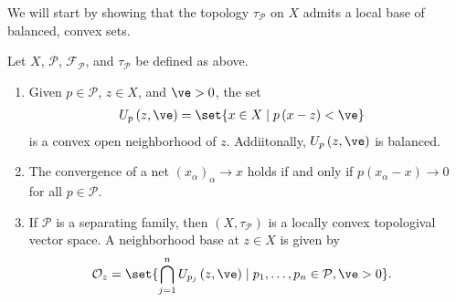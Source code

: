 \documentclass[10pt]{mypackage}
\begin{document}
We will start by showing that the topology $\tau_{\mathcal{P}}$ on $X$ admits a local base of balanced, convex sets.
\begin{theorem}
  Let $X$, $\mathcal{P}$, $\mathcal{F}_{\mathcal{P}}$, and $\tau_{\mathcal{P}}$ be defined as above.
  \begin{enumerate}[(1)]
    \item Given $p\in \mathcal{P}$, $z\in X$, and $\ve > 0$, the set
      \begin{align*}
        U_{p}\left(z,\ve\right) &= \set{x\in X\mid p\left(x-z\right) < \ve}
      \end{align*}
      is a convex open neighborhood of $z$. Addiitonally, $U_{p}\left(z,\ve\right)$ is balanced.
    \item The convergence of a net $\left(x_{\alpha}\right)_{\alpha}\rightarrow x$ holds if and only if $p\left(x_{\alpha}-x\right)\rightarrow 0$ for all $p\in \mathcal{P}$.
    \item If $\mathcal{P}$ is a separating family, then $\left(X,\tau_{\mathcal{P}}\right)$ is a locally convex topologival vector space. A neighborhood base at $z\in X$ is given by
      \begin{align*}
        \mathcal{O}_{z} &= \set{\bigcap_{j=1}^{n}U_{p_j}\left(z,\ve\right)\mid p_1,\dots,p_n\in \mathcal{P},\ve > 0}.
      \end{align*}
  \end{enumerate}
\end{theorem}
\end{document}

